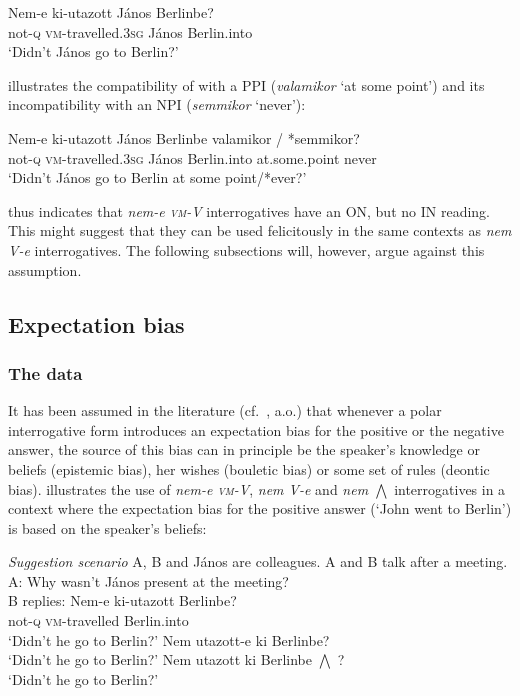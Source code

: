 \documentclass[output=paper,colorlinks,citecolor=brown]{langscibook}
\begin{document}
	\ea\label{ex:nem-e-elutazott}
	\gll Nem-e ki-utazott János Berlinbe?\\
	not-\textsc{q} \textsc{vm}-travelled.\textsc{3sg} János Berlin.into\\ 
	\glt `Didn't János go to Berlin?'
	\z
	
	\noindent {} illustrates the compatibility of  with a PPI (\textit{valamikor} `at some point') and its incompatibility with an NPI (\textit{semmikor} `never'): 
	
	\ea\label{ex:nem-e-elutazott-ON}
	\gll Nem-e ki-utazott János Berlinbe {valamikor \hspace{0.4cm}/} *semmikor?\\
	not-\textsc{q} \textsc{vm}-travelled.\textsc{3sg} János Berlin.into at.some.point  \hspace{0.15cm}never\\ \glt `Didn't János go to Berlin at some point/*ever?'
	\z
	
	\noindent {}
	thus indicates that \textit{nem-e \textsc{vm}-V} interrogatives have an ON, but no IN reading. This might suggest that they can be used felicitously in the same contexts as \textit{nem V-e}  interrogatives. The following subsections will, however, argue against this assumption.   
	
	
\subsection{Expectation bias}\label{sect:exp_bias}
\subsubsection{The data}\label{sect:exp_bias_data}
	
	It has been assumed in the literature (cf.~\citealt{Reese2007, sudo2013}, a.o.) that whenever a polar interrogative form introduces an expectation bias for the positive or the negative answer, the source of this bias can in principle be the speaker's knowledge or beliefs (epistemic bias), her wishes (bouletic bias) or some set of rules (deontic bias).  illustrates the use of \textit{nem-e \textsc{vm}-V},  \textit{nem V-e} and \textit{nem $\bigwedge$} interrogatives in a context where the expectation bias for the positive answer (`John went to Berlin') is based on the speaker's beliefs:
	
	\ea\label{ex:sugg}  
	\textit{Suggestion scenario}
	\sn A, B and János are colleagues. A and B talk after a meeting.\\
	A: Why wasn't János present at the meeting?\\
	B replies:
	\ea\gll Nem-e  ki-utazott Berlinbe?\\
	not\textsc{-q}	\textsc{vm-}travelled Berlin.into\\	
	\glt `Didn't he go to Berlin?' 
	\ex Nem utazott-e ki Berlinbe?\\ 
	`Didn't he go to Berlin?'
	\ex Nem utazott ki Berlinbe $\bigwedge$ ?\\
	`Didn't he go to Berlin?'
	\z
	\z
	
\end{document}

